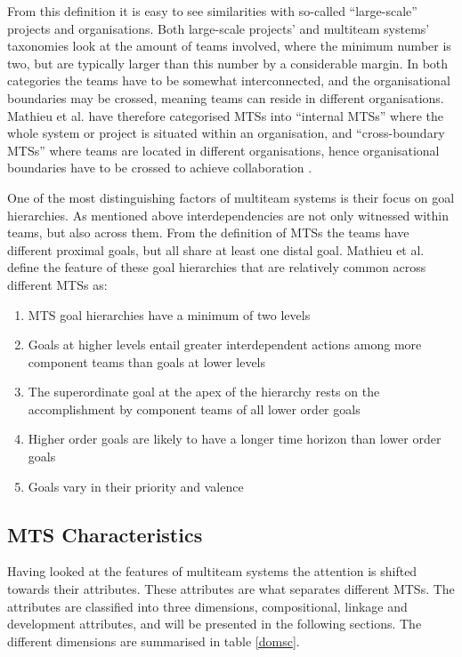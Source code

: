 From this definition it is easy to see similarities with so-called ``large-scale'' projects and organisations. Both large-scale projects' and multiteam systems' taxonomies look at the amount of teams involved, where the minimum number is two, but are typically larger than this number by a considerable margin. In both categories the teams have to be somewhat interconnected, and the organisational boundaries may be crossed, meaning teams can reside in different organisations. Mathieu et al. have therefore categorised MTSs into ``internal MTSs'' where the whole system or project is situated within an organisation, and ``cross-boundary MTSs'' where teams are located in different organisations, hence organisational boundaries have to be crossed to achieve collaboration \cite{TODO}.

One of the most distinguishing factors of multiteam systems is their focus on goal hierarchies. As mentioned above interdependencies are not only witnessed within teams, but also across them. From the definition of MTSs the teams have different proximal goals, but all share at least one distal goal. Mathieu et al. define the feature of these goal hierarchies that are relatively common across different MTSs as:

\begin{enumerate}
  \item MTS goal hierarchies have a minimum of two levels
  \item Goals at higher levels entail greater interdependent actions among more component teams than goals at lower levels
  \item The superordinate goal at the apex of the hierarchy rests on the accomplishment by component teams of all lower order goals
  \item Higher order goals are likely to have a longer time horizon than lower order goals
  \item Goals vary in their priority and valence
\end{enumerate}


\subsection{MTS Characteristics}

Having looked at the features of multiteam systems the attention is shifted towards their attributes. These attributes are what separates different MTSs. The attributes are classified into three dimensions, compositional, linkage and development attributes, and will be presented in the following sections. The different dimensions are summarised in table \ref{domsc}.

